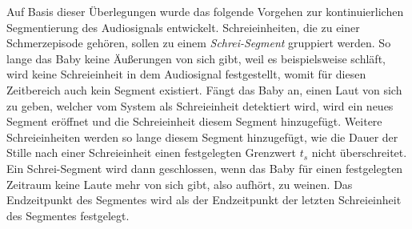 

Auf Basis dieser Überlegungen wurde das folgende Vorgehen zur kontinuierlichen Segmentierung des Audiosignals entwickelt. Schreieinheiten, die zu einer Schmerzepisode gehören, sollen zu einem \emph{Schrei-Segment} gruppiert werden. So lange das Baby keine Äußerungen von sich gibt, weil es beispielsweise schläft, wird keine Schreieinheit in dem Audiosignal festgestellt, womit für diesen Zeitbereich auch kein Segment existiert. Fängt das Baby an, einen Laut von sich zu geben, welcher vom System als Schreieinheit detektiert wird, wird ein neues Segment eröffnet und die Schreieinheit diesem Segment hinzugefügt. Weitere Schreieinheiten werden so lange diesem Segment hinzugefügt, wie die Dauer der Stille nach einer Schreieinheit einen festgelegten Grenzwert $t_{s}$ nicht überschreitet. Ein Schrei-Segment wird dann geschlossen, wenn das Baby für einen festgelegten Zeitraum keine Laute mehr von sich gibt, also \glqq aufhört, zu weinen\grqq{}. Das Endzeitpunkt des Segmentes wird als der Endzeitpunkt der letzten Schreieinheit des Segmentes festgelegt.

